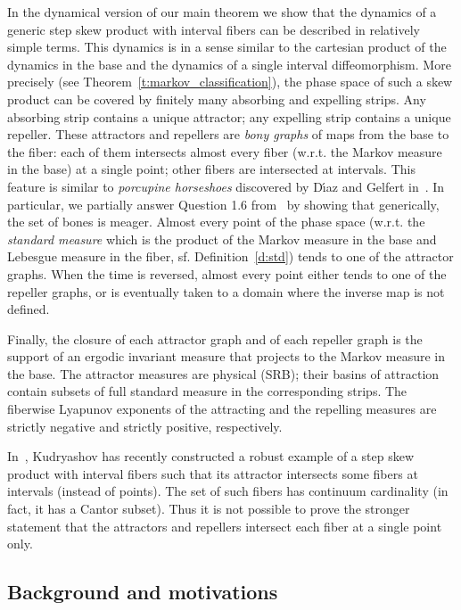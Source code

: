 \documentclass[a4paper,12pt]{amsart}
\begin{document}
In the dynamical version of our main theorem we show that the dynamics of a generic step skew product with interval fibers can be described in relatively simple terms. This dynamics is in a sense similar to the cartesian product of the dynamics in the base and the dynamics of a single interval diffeomorphism. More precisely (see Theorem~\ref{t:markov_classification}), the phase space of such a skew product can be covered by finitely many absorbing and expelling strips. Any absorbing strip contains a unique attractor; any expelling strip contains a unique repeller. These attractors and repellers are \emph{bony graphs} of maps from the base to the fiber: each of them intersects almost every fiber (w.r.t. the Markov measure in the base) at a single point; other fibers are intersected at intervals. This feature is similar to \emph{porcupine horseshoes} discovered by {D\'{\i}az} and Gelfert in~\cite{Diaz2012}. In particular, we partially answer Question 1.6 from~\cite{Diaz2012} by showing that generically, the set of bones is meager. Almost every point of the phase space (w.r.t. the \emph{standard measure} which is the product of the Markov measure in the base and Lebesgue measure in the fiber, sf. Definition~\ref{d:std}) tends to one of the attractor graphs. When the time is reversed, almost every point either tends to one of the repeller graphs, or is eventually taken to a domain where the inverse map is not defined.

Finally, the closure of each attractor graph and of each repeller graph is the support of an ergodic invariant measure that projects to the Markov measure in the base. The attractor measures are physical (SRB); their basins of attraction contain subsets of full standard measure in the corresponding strips. The fiberwise Lyapunov exponents of the attracting and the repelling measures are strictly negative and strictly positive, respectively.

In~\cite{Kudryashov2010}, Kudryashov has recently constructed a robust example of a step skew product with interval fibers such that its attractor intersects some fibers at intervals (instead of points). The set of such fibers has continuum cardinality (in fact, it has a Cantor subset). Thus it is not possible to prove the stronger statement that the attractors and repellers intersect each fiber at a single point only.

\subsection{Background and motivations}
\end{document}
